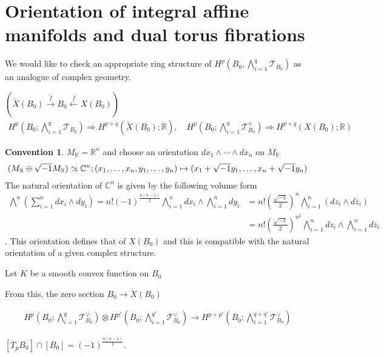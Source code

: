 \documentclass[a4paper,dvipdfmx,reqno,12pt]{amsart}
\theoremstyle{definition}
\newtheorem{Conv}[Thm]{Convention}
\newcommand{\C}{\mathbb{C}}%
\newcommand{\R}{\mathbb{R}}%
\newcommand{\mcal}[1]{\mathcal{#1}}%
\newcommand{\Paren}[1]{\left ( {#1} \right )}%
\newcommand{\xto}[1]{\xrightarrow{#1}}
\newcommand{\TB}{\mcal{T}_{B_0}}
\newcommand{\simto}{ 
\mathrel{\raisebox{0.13em}{${\sim}$}}
\kern -0.75em \mathrel{\raisebox{-0.11em}{${\scriptstyle \to}$}}  
}
\numberwithin{equation}{section}
\begin{document}
\section{Orientation of integral affine manifolds and dual torus fibrations}

We would like to check an appropriate ring structure of
$H^{p}(B_0,\bigwedge_{i=1}^{q}\TB)$ as an analogue of complex geometry.

$(\check{X}(B_0)\xto{\check{f}} B_0 \stackrel{f}{\gets} X(B_0))$
\begin{align}
  H^{p}(B_0;\bigwedge_{i=1}^{q}\TB) \Longrightarrow
  H^{p+q}(\check{X}(B_0);\R),
  \quad
  H^{p}(B_0;\bigwedge_{i=1}^{q}\TB^{\vee}) \Longrightarrow
  H^{p+q}(X(B_0);\R)
\end{align}

\begin{Conv}
  $M_{\R}=\R^{n}$ and choose an orientation
  $dx_1\wedge \cdots\wedge dx_n$ on $M_{\R}$
  \begin{align}
    (M_{\R}\oplus \sqrt{-1}M_{\R})\simto\C^{n};(x_1,\ldots,x_n,y_1,\ldots,y_n)
    \mapsto (x_1+\sqrt{-1}y_1,\ldots,x_n+\sqrt{-1}y_n)
  \end{align}
  The natural orientation of $\C^{n}$ is given by the following volume form
  \begin{align}
    \bigwedge^{n}(\sum_{i=1}^{n} dx_i\wedge dy_i)
    =n!\Paren{-1}^{\frac{n(n-1)}{2}}\bigwedge_{i=1}^{n} dx_i\wedge
    \bigwedge_{i=1}^{n} dy_i
     & =n!\Paren{\frac{\sqrt{-1}}{2}}^{n} \bigwedge_{i=1}^{n}
    (dz_i\wedge d\overline{z}_i)                                  \\
     & =n!\Paren{\frac{\sqrt{-1}}{2}}^{n^{2}} \bigwedge_{i=1}^{n}
    dz_i\wedge \bigwedge_{i=1}^{n}d\overline{z}_i
  \end{align}
  \cite[p.18]{griffithsPrinciplesAlgebraicGeometry1994a}.
  This orientation defines that of $X(B_0)$ and this is compatible with
  the natural orientation of a given complex structure.
\end{Conv}

Let $K$ be a smooth convex function on $B_0$

From this, the zero section $B_0\to \check{X}(B_0)$

\begin{align}
  H^{p}(B_0;\bigwedge_{i=1}^{q}\TB^{\vee})\otimes H^{p'}(B_0;\bigwedge_{i=1}^{q'}\TB^{\vee})
  \to H^{p+p'}(B_0;\bigwedge_{i=1}^{q+q'}\TB^{\vee})
\end{align}

$[T_pB_0]\cap [B_0]=(-1)^{\frac{n(n-1)}{2}}$.
\end{document}
